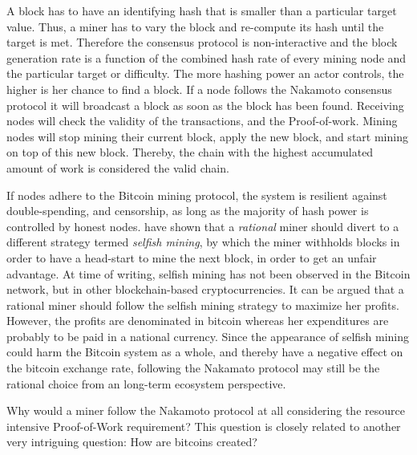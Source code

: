 A block has to have an identifying hash that is smaller than a particular target value. Thus, a miner has to vary the block and re-compute its hash until the target is met. Therefore the consensus protocol is non-interactive and the block generation rate is a function of the combined hash rate of every mining node and the particular target or difficulty. The more hashing power an actor controls, the higher is her chance to find a block. If a node follows the Nakamoto consensus protocol it will broadcast a block as soon as the block has been found. Receiving nodes will check the validity of the transactions, and the Proof-of-work. Mining nodes will stop mining their current block, apply the new block, and start mining on top of this new block. Thereby, the chain with the highest accumulated amount of work is considered the valid chain. 

If nodes adhere to the Bitcoin mining protocol, the system is resilient against double-spending, and censorship, as long as the majority of hash power is controlled by honest nodes. \cite{Eyal2014} have shown that a \emph{rational} miner should divert to a different strategy termed \emph{selfish mining}, by which the miner withholds blocks in order to have a head-start to mine the next block, in order to get an unfair advantage. At time of writing, selfish mining has not been observed in the Bitcoin network, but in other blockchain-based cryptocurrencies. It can be argued that a rational miner should follow the selfish mining strategy to maximize her profits. However, the profits are denominated in bitcoin whereas her expenditures are probably to be paid in a national currency. Since the appearance of selfish mining could harm the Bitcoin system as a whole, and thereby have a negative effect on the bitcoin exchange rate, following the Nakamato protocol may still be the rational choice from an long-term ecosystem perspective. 


Why would a miner follow the Nakamoto protocol at all considering the resource intensive Proof-of-Work requirement? This question is closely related to another very intriguing question: How are bitcoins created?

